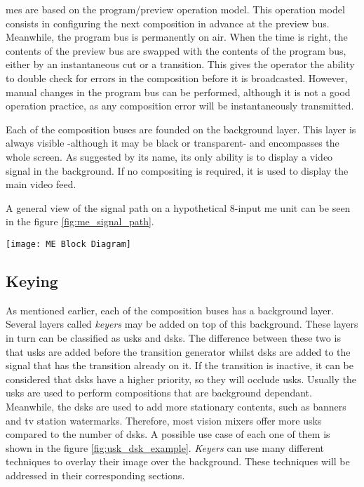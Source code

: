 \documentclass[../main.tex]{subfiles}
\begin{document}
\Glspl{me} are based on the program/preview operation model. This operation model consists in configuring the next composition in advance at the preview bus. Meanwhile, the program bus is permanently on air. When the time is right, the contents of the preview bus are swapped with the contents of the program bus, either by an instantaneous cut or a transition. This gives the operator the ability to double check for errors in the composition before it is broadcasted. However, manual changes in the program bus can be performed, although it is not a good operation practice, as any composition error will be instantaneously transmitted.\newline

Each of the composition buses are founded on the background layer. This layer is always visible -although it may be black or transparent- and encompasses the whole screen. As suggested by its name, its only ability is to display a video signal in the background. If no compositing is required, it is used to display the main video feed.\newline

A general view of the signal path on a hypothetical 8-input \gls{me} unit can be seen in the figure \ref{fig:me_signal_path}.\newline

\begin{sidewaysfigure}[hbtp]
    \centering
    \texttt{[image: ME Block Diagram]}

    \label{fig:me_signal_path}
    \caption{Signal path on a hypothetical ME with 8 inputs, 4 USKs and 2 DSKs}
\end{sidewaysfigure}

\subsection{Keying}
As mentioned earlier, each of the composition buses has a background layer. Several layers called \textit{keyers} may be added on top of this background. These layers in turn can be classified as \glspl{usk} and \glspl{dsk}. The difference between these two is that \glspl{usk} are added before the transition generator whilst \glspl{dsk} are added to the signal that has the transition already on it. If the transition is inactive, it can be considered that \glspl{dsk} have a higher priority, so they will occlude \glspl{usk}. Usually the \glspl{usk} are used to perform compositions that are background dependant. Meanwhile, the \glspl{dsk} are used to add more stationary contents, such as banners and \gls{tv} station watermarks. Therefore, most vision mixers offer more \glspl{usk} compared to the number of \glspl{dsk}. A possible use case of each one of them is shown in the figure \ref{fig:usk_dsk_example}. \textit{Keyers} can use many different techniques to overlay their image over the background. These techniques will be addressed in their corresponding sections. \newline
 
\end{document}
